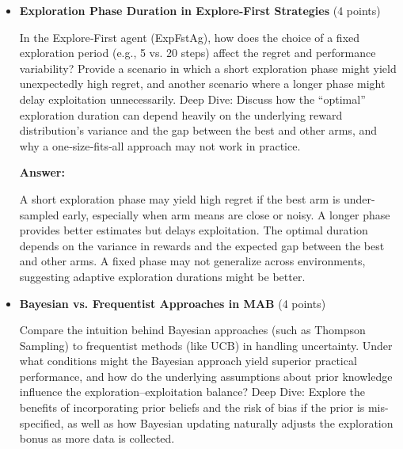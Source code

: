 \documentclass[12pt]{article}
\begin{document}
{{{\begin{itemize}[noitemsep]
    \textbf{Answer:}

    A conservative (high) exploration bonus causes the UCB agent to over-sample uncertain arms, even if they appear suboptimal, which slows down learning. In contrast, a lower bonus may speed up convergence but risks prematurely discarding potentially good arms due to variance. In practice, tuning the bonus is crucial to balance exploration with convergence speed.

    \item \textbf{Exploration Phase Duration in Explore-First Strategies} (4 points)
    
    \vspace{0.25cm}
    In the Explore‑First agent (ExpFstAg), how does the choice of a fixed exploration period (e.g., 5 vs. 20 steps) affect the regret and performance variability? Provide a scenario in which a short exploration phase might yield unexpectedly high regret, and another scenario where a longer phase might delay exploitation unnecessarily.
    Deep Dive:
    Discuss how the “optimal” exploration duration can depend heavily on the underlying reward distribution’s variance and the gap between the best and other arms, and why a one‑size‑fits‑all approach may not work in practice.
    \vspace{0.5cm}

    \textbf{Answer:}

    A short exploration phase may yield high regret if the best arm is under-sampled early, especially when arm means are close or noisy. A longer phase provides better estimates but delays exploitation. The optimal duration depends on the variance in rewards and the expected gap between the best and other arms. A fixed phase may not generalize across environments, suggesting adaptive exploration durations might be better.

    \item \textbf{Bayesian vs. Frequentist Approaches in MAB} (4 points)
    
    \vspace{0.25cm}
    Compare the intuition behind Bayesian approaches (such as Thompson Sampling) to frequentist methods (like UCB) in handling uncertainty. Under what conditions might the Bayesian approach yield superior practical performance, and how do the underlying assumptions about prior knowledge influence the exploration–exploitation balance?
    Deep Dive:
    Explore the benefits of incorporating prior beliefs and the risk of bias if the prior is mis-specified, as well as how Bayesian updating naturally adjusts the exploration bonus as more data is collected.
    \vspace{0.5cm}


\end{itemize}}}}
\end{document}
